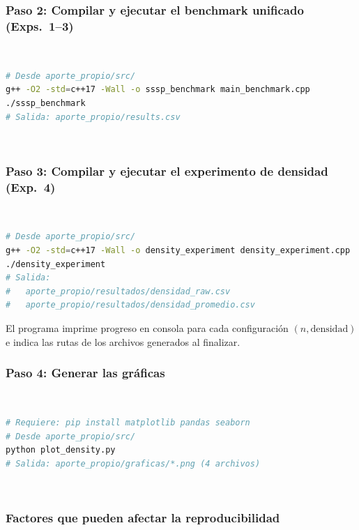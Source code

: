 \subsubsection*{Paso 2: Compilar y ejecutar el benchmark unificado (Exps.\ 1–3)}
~\\
\begin{lstlisting}[language=bash,
  caption={Benchmark unificado — genera \texttt{results.csv}.}, captionpos=b]
# Desde aporte_propio/src/
g++ -O2 -std=c++17 -Wall -o sssp_benchmark main_benchmark.cpp
./sssp_benchmark
# Salida: aporte_propio/results.csv
\end{lstlisting}
~\\
\subsubsection*{Paso 3: Compilar y ejecutar el experimento de densidad (Exp.\ 4)}
~\\
\begin{lstlisting}[language=bash,
  caption={Experimento de densidad — genera dos CSV en \texttt{resultados/}.}, captionpos=b]
# Desde aporte_propio/src/
g++ -O2 -std=c++17 -Wall -o density_experiment density_experiment.cpp
./density_experiment
# Salida:
#   aporte_propio/resultados/densidad_raw.csv
#   aporte_propio/resultados/densidad_promedio.csv
\end{lstlisting}

El programa imprime progreso en consola para cada configuración
$(n, \text{densidad})$ e indica las rutas de los archivos generados al
finalizar.
~\\
\subsubsection*{Paso 4: Generar las gráficas}
~\\
\begin{lstlisting}[language=bash,
  caption={Generación de gráficas PNG.}, captionpos=b]
# Requiere: pip install matplotlib pandas seaborn
# Desde aporte_propio/src/
python plot_density.py
# Salida: aporte_propio/graficas/*.png (4 archivos)
\end{lstlisting}
~\\

\subsubsection*{Factores que pueden afectar la reproducibilidad}

